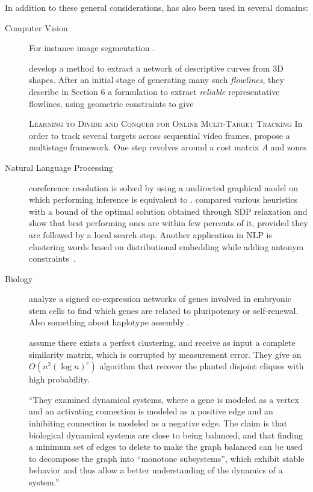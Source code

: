 In addition to these general considerations, \pcc{} has also been used in several domains:
\begin{description}
   \item[Computer Vision] For instance image segmentation
      \autocites{Bagon2011}{Kim2011}{VolumeSegmentation12}.

\Textcite{Shape3D17} develop a method to extract a network of descriptive curves from 3D shapes.
After an initial stage of generating many such \emph{flowlines}, they describe in Section 6 a \pcc{}
formulation to extract \emph{reliable} representative flowlines, using geometric constraints to give 

\textsc{Learning to Divide and Conquer for Online Multi-Target Tracking}
In order to track several targets across sequential video frames, \textcite{multiTracking15} propose
a multistage framework. One step revolves around a cost matrix $A$ and zones

\item[Natural Language Processing] 
   coreference resolution is solved by \textcite[Section 2.3]{graphicalCoreference04} using a
undirected graphical model on which performing inference is equivalent to \pcc{}.
	     \Textcite{Elsner2009} compared various heuristics with a bound of the optimal solution
	     obtained through SDP relaxation and show that best performing ones are within few
	     percents of it, provided they are followed by a local search step.
Another application in NLP is clustering words based on distributional embedding while adding
antonym constraints~\autocite{SignedWordRatings}.
\item[Biology]

		\Textcite{Mason2009} analyze a signed co-expression networks of genes
		involved in embryonic stem cells to find which genes are related to
		pluripotency or self-renewal.  Also something about haplotype assembly
		\autocite{Das2015}.

\Textcite{Ben-Dor99} assume there exists a perfect clustering, and receive as
input a complete similarity matrix, which is corrupted by measurement error.
They give an $O(n^2(\log n)^c)$ algorithm that recover the planted disjoint
cliques with high probability.

	   \enquote{They examined dynamical systems, where a gene is modeled as a vertex and an
	      activating connection is modeled as a positive edge and an inhibiting connection is
	      modeled as a negative edge. The claim is that biological dynamical systems are close
	      to being balanced, and that finding a minimum set of edges to delete to make the graph
	      balanced can be used to decompose the graph into “monotone subsystems”, which exhibit
	   stable behavior and thus allow a better understanding of the dynamics of a
	system.}\autocite{monotoneBiology07}


\end{description}
